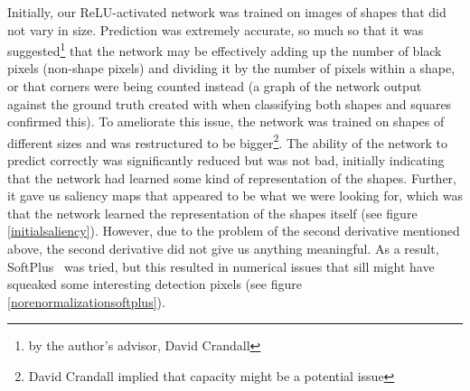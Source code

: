 Initially, our ReLU-activated network was trained on images of shapes that did not vary in size.
Prediction was extremely accurate, so much so that it was suggested\footnote{by the author's
advisor, David Crandall} that the network may be effectively adding up the number of black pixels
(non-shape pixels) and dividing it by the number of pixels within a shape, or that corners were
being counted instead (a graph of the network output against the ground truth created with
\cite{Hunter:2007} when classifying both shapes and squares confirmed this). To ameliorate this
issue, the network was trained on shapes of different sizes and was restructured to be
bigger\footnote{David Crandall implied that capacity might be a potential issue}. The ability of the
network to predict correctly was significantly reduced but was not bad, initially indicating that
the network had learned some kind of representation of the shapes. Further, it gave us saliency maps
that appeared to be what we were looking for, which was that the network learned the representation
of the shapes itself (see figure \ref{initialsaliency}). However, due to the problem of the second
derivative mentioned above, the second derivative did not give us anything meaningful. As a result,
SoftPlus~\cite{NIPS2000_44968aec} was tried, but this resulted in numerical issues that sill might
have squeaked some interesting detection pixels (see figure \ref{norenormalizationsoftplus}).

